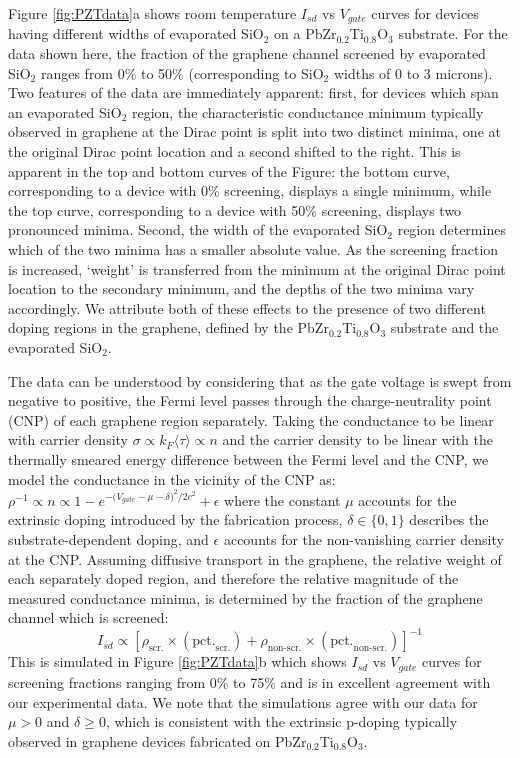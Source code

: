 \documentclass[edeposit,fullpage,draftthesis]{uiucthesis2009}
\begin{document}
        Figure \ref{fig:PZTdata}a shows room temperature $I_{sd}$ vs $V_{gate}$ curves for devices having different widths of evaporated SiO$_2$ on a PbZr$_{0.2}$Ti$_{0.8}$O$_3$ substrate. For the data shown here, the fraction of the graphene channel screened by evaporated SiO$_2$ ranges from 0\% to 50\% (corresponding to SiO$_2$ widths of 0 to 3 microns). Two features of the data are immediately apparent: first, for devices which span an evaporated SiO$_2$ region, the characteristic conductance minimum typically observed in graphene at the Dirac point is split into two distinct minima, one at the original Dirac point location and a second shifted to the right. This is apparent in the top and bottom curves of the Figure: the bottom curve, corresponding to a device with 0\% screening, displays a single minimum, while the top curve, corresponding to a device with 50\% screening, displays two pronounced minima. Second, the width of the evaporated SiO$_2$ region determines which of the two minima has a smaller absolute value. As the screening fraction is increased, `weight' is transferred from the minimum at the original Dirac point location to the secondary minimum, and the depths of the two minima vary accordingly. We attribute both of these effects to the presence of two different doping regions in the graphene, defined by the PbZr$_{0.2}$Ti$_{0.8}$O$_3$ substrate and the evaporated SiO$_2$.

        The data can be understood by considering that as the gate voltage is swept from negative to positive, the Fermi level passes through the charge-neutrality point (CNP) of each graphene region separately. Taking the conductance to be linear with carrier density\cite{Hwang2007} $\sigma \propto k_F \langle\tau\rangle \propto n$ and the carrier density to be linear with the thermally smeared energy difference between the Fermi level and the CNP\cite{CastroNeto2009}, we model the conductance in the vicinity of the CNP as: $\rho^{-1} \propto n \propto 1 - e^{{-(V_{gate}}-\mu-\delta)^2/2c^2} + \epsilon$ where the constant $\mu$ accounts for the extrinsic doping introduced by the fabrication process, $\delta \in \{0,1\}$ describes the substrate-dependent doping, and $\epsilon$ accounts for the non-vanishing carrier density at the CNP. Assuming diffusive transport in the graphene, the relative weight of each separately doped region, and therefore the relative magnitude of the measured conductance minima, is determined by the fraction of the graphene channel which is screened:
        $$I_{sd} \propto \left[ \rho_\text{scr.} \times (\text{pct.}_\text{scr.}) + \rho_\text{non-scr.} \times (\text{pct.}_\text{non-scr.}) \right]^{-1}$$
        This is simulated in Figure \ref{fig:PZTdata}b which shows $I_{sd}$ vs $V_{gate}$ curves for screening fractions ranging from 0\% to 75\% and is in excellent agreement with our experimental data. We note that the simulations agree with our data for $\mu > 0$ and $\delta \geq 0$, which is consistent with the extrinsic p-doping typically observed in graphene devices fabricated on PbZr$_{0.2}$Ti$_{0.8}$O$_3$\cite{Baeumer2013}.
\end{document}
